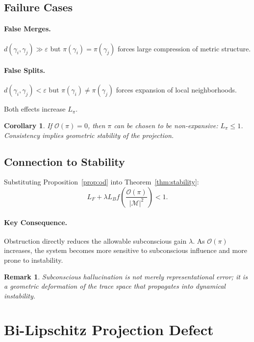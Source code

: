 \documentclass[12pt,a4paper]{article}
\newtheorem{corollary}[theorem]{Corollary}
\newtheorem{remark}[theorem]{Remark}
\begin{document}
\subsection{Failure Cases}

\paragraph{False Merges.}
$d(\gamma_i,\gamma_j) \gg \varepsilon$ but $\pi(\gamma_i)=\pi(\gamma_j)$ forces large compression of metric structure.

\paragraph{False Splits.}
$d(\gamma_i,\gamma_j) < \varepsilon$ but $\pi(\gamma_i)\neq\pi(\gamma_j)$ forces expansion of local neighborhoods.

Both effects increase $L_\pi$.

\begin{corollary}
If $\mathcal{O}(\pi) = 0$, then $\pi$ can be chosen to be non-expansive: $L_\pi \leq 1$. Consistency implies geometric stability of the projection.
\end{corollary}

\subsection{Connection to Stability}

Substituting Proposition~\ref{prop:od} into Theorem~\ref{thm:stability}:
\[
L_F + \lambda L_B f\!\left(\frac{\mathcal{O}(\pi)}{|\mathcal{M}|^2}\right) < 1.
\]

\paragraph{Key Consequence.}
Obstruction directly reduces the allowable subconscious gain $\lambda$. As $\mathcal{O}(\pi)$ increases, the system becomes more sensitive to subconscious influence and more prone to instability.

\begin{remark}
Subconscious hallucination is not merely representational error; it is a geometric deformation of the trace space that propagates into dynamical instability.
\end{remark}

\section{Bi-Lipschitz Projection Defect}
\label{sec:bilipschitz}
\end{document}

